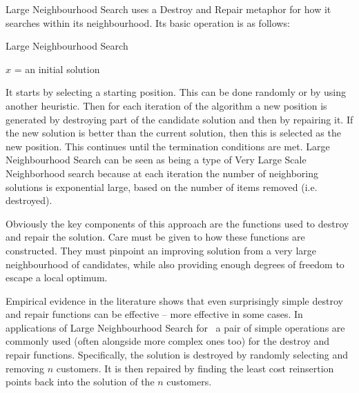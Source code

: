 Large Neighbourhood Search uses a Destroy and Repair metaphor for how it searches within its neighbourhood. Its basic operation is as follows:

\begin{algorithm}[H]
   \caption{Large Neighbourhood Search}
   $x$ = an initial solution\\
\end{algorithm}

It starts by selecting a starting position. This can be done randomly or by using another heuristic. Then for each iteration of the algorithm a new position is generated by destroying part of the candidate solution and then by repairing it. If the new solution is better than the current solution, then this is selected as the new position. This continues until the termination conditions are met. Large Neighbourhood Search can be seen as being a type of Very Large Scale Neighborhood search because at each iteration the number of neighboring solutions is exponential large, based on the number of items removed (i.e. destroyed).

Obviously the key components of this approach are the functions used to destroy and repair the solution. Care must be given to how these functions are constructed. They must pinpoint an improving solution from a very large neighbourhood of candidates, while also providing enough degrees of freedom to escape a local optimum.

Empirical evidence in the literature shows that even surprisingly simple destroy and repair functions can be effective -- more effective in some cases\cite{Shaw:1998}\cite{Ropke:2005}. In applications of Large Neighbourhood Search for \VRP\ a pair of simple operations are commonly used (often alongside more complex ones too) for the destroy and repair functions. Specifically, the solution is destroyed by randomly selecting and removing $n$ customers. It is then repaired by finding the least cost reinsertion points back into the solution of the $n$ customers.

